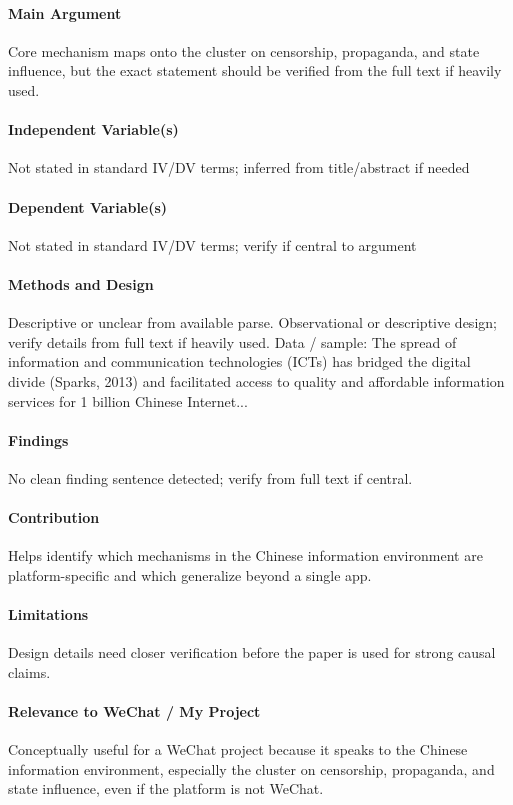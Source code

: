 \documentclass[12pt]{article}
\begin{document}
\paragraph{Main Argument} Core mechanism maps onto the cluster on censorship, propaganda, and state influence, but the exact statement should be verified from the full text if heavily used.

\paragraph{Independent Variable(s)} Not stated in standard IV/DV terms; inferred from title/abstract if needed

\paragraph{Dependent Variable(s)} Not stated in standard IV/DV terms; verify if central to argument

\paragraph{Methods and Design} Descriptive or unclear from available parse. Observational or descriptive design; verify details from full text if heavily used. Data / sample: The spread of information and communication technologies (ICTs) has bridged the digital divide (Sparks, 2013) and facilitated access to quality and affordable information services for 1 billion Chinese Internet...

\paragraph{Findings} No clean finding sentence detected; verify from full text if central.

\paragraph{Contribution} Helps identify which mechanisms in the Chinese information environment are platform-specific and which generalize beyond a single app.

\paragraph{Limitations} Design details need closer verification before the paper is used for strong causal claims.

\paragraph{Relevance to WeChat / My Project} Conceptually useful for a WeChat project because it speaks to the Chinese information environment, especially the cluster on censorship, propaganda, and state influence, even if the platform is not WeChat.
\end{document}
